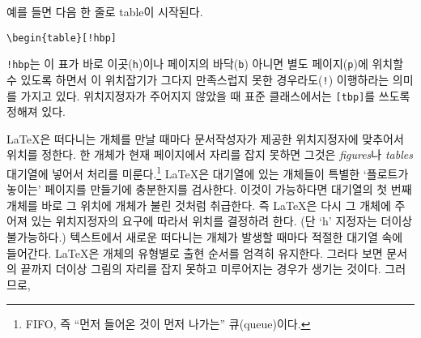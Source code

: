 예를 들면 다음 한 줄로 table이 시작된다.
\begin{code}
\verb|\begin{table}[!hbp]|
\end{code}
\noindent {} \verb|!hbp|는 이 표가 바로 이곳(\texttt{h})이나 페이지의 바닥(\texttt{b})
아니면 별도 페이지(\texttt{p})에 위치할 수 있도록 하면서 이 위치잡기가 그다지 만족스럽지 못한 경우라도(\texttt{!})
이행하라는 의미를 가지고 있다. 위치지정자가 주어지지 않았을 때 표준 클래스에서는 \verb|[tbp]|를 쓰도록 정해져 있다.

\LaTeX 은 떠다니는 개체를 만날 때마다 문서작성자가 제공한 위치지정자에 맞추어서 위치를 정한다.
한 개체가 현재 페이지에서 자리를 잡지 못하면 그것은 \emph{figures}나 \emph{tables} 대기열에
넣어서 처리를 미룬다.\footnote{FIFO, 즉 ``먼저 들어온 것이 먼저 나가는'' 큐(queue)이다.}
\LaTeX 은 대기열에 있는 개체들이 특별한 `플로트가 놓이는' 페이지를 만들기에 충분한지를 검사한다.
이것이 가능하다면 대기열의 첫 번째 개체를 바로 그 위치에 개체가 불린 것처럼 취급한다. 즉
\LaTeX 은 다시 그 개체에 주어져 있는 위치지정자의 요구에 따라서 위치를 결정하려 한다. (단 `h'
지정자는 더이상 불가능하다.)
텍스트에서 새로운 떠다니는 개체가 발생할 때마다 적절한 대기열 속에 들어간다.
\LaTeX 은 개체의 유형별로 출현 순서를 엄격히 유지한다. 그러다 보면 문서의 끝까지
더이상 그림의 자리를 잡지 못하고 미루어지는 경우가 생기는 것이다.
그러므로,

